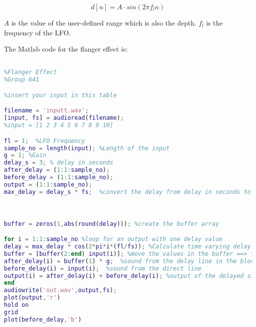 \begin{equation}
	d[n]= A \cdot sin(2\pi f_{l} n)
\end{equation}

$A$ is the value of the user-defined range which is also the depth. $f_{l}$ is the frequency of the LFO. 

The Matlab code for the flanger effect is:

\begin{lstlisting}[language=Matlab, caption= Matlab code for flanger effect]

%Flanger Effect
%Group 641

%insert your input in this table

filename = 'inputt.wav';
[input, fs] = audioread(filename);
%input = [1 2 3 4 5 6 7 8 9 10]

fl = 1;  %LFO Frequency
sample_no = length(input); %Length of the input
g = 1; %Gain
delay_s = 3; % delay in seconds 
after_delay = (1:1:sample_no); 
before_delay = (1:1:sample_no);
output = (1:1:sample_no);
max_delay = delay_s * fs;  %convert the delay from delay in seconds to delay in samples



buffer = zeros(1,abs(round(delay))); %create the buffer array 

for i = 1:1:sample_no %loop for an output with one delay value
delay = max_delay * cos(2*pi*i*(fl/fs)); %Calculate time varying delay (unit is samples)
buffer = [buffer(2:end) input(i)]; %move the values in the buffer ==> first value overwritten, one new value added at the end
after_delay(i) = buffer(1) * g;  %sound from the delay line in the block diagram
before_delay(i) = input(i);  %sound from the direct line
output(i) = after_delay(i) + before_delay(i); %output of the delayed signal 
end
audiowrite('out.wav',output,fs);
plot(output,'r')
hold on
grid
plot(before_delay,'b')



\end{lstlisting}





